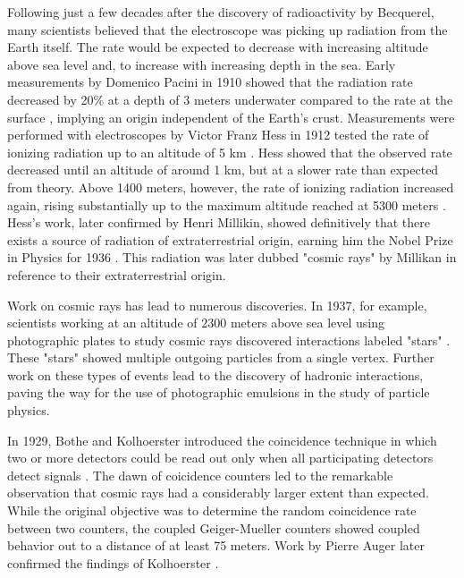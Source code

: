 Following just a few decades after the discovery of radioactivity by Becquerel, many scientists believed that the electroscope was picking up radiation from the Earth itself.
The rate would be expected to decrease with increasing altitude above sea level and, to increase with increasing depth in the sea.
Early measurements by Domenico Pacini in 1910 showed that the radiation rate decreased by 20\% at a depth of 3 meters underwater compared to the rate at the surface \cite{Pacini-CRSource}, implying an origin independent of the Earth's crust.
Measurements were performed with electroscopes by Victor Franz Hess in 1912 tested the rate of ionizing radiation up to an altitude of 5 km \cite{Hoerandel-CRHistory}.
Hess showed that the observed rate decreased until an altitude of around 1 km, but at a slower rate than expected from theory.
Above 1400 meters, however, the rate of ionizing radiation increased again, rising substantially up to the maximum altitude reached at 5300 meters \cite{Compton-CRAltitude}.
Hess's work, later confirmed by Henri Millikin, showed definitively that there exists a source of radiation of extraterrestrial origin, earning him the Nobel Prize in Physics for 1936 \cite{NobelPrize:1936-Hess}.
This radiation was later dubbed "cosmic rays" by Millikan in reference to their extraterrestrial origin.

Work on cosmic rays has lead to numerous discoveries.
In 1937, for example, scientists working at an altitude of 2300 meters above sea level using photographic plates to study cosmic rays discovered interactions labeled "stars" \cite{Blau-HadronicShowers}. 
These "stars" showed multiple outgoing particles from a single vertex.
Further work on these types of events lead to the discovery of hadronic interactions, paving the way for the use of photographic emulsions in the study of particle physics.

In 1929, Bothe and Kolhoerster introduced the coincidence technique in which two or more detectors could be read out only when all participating detectors detect signals \cite{Kolhoerster-CoincidenceDetectors}.
The dawn of coicidence counters led to the remarkable observation that cosmic rays had a considerably larger extent than expected.
While the original objective was to determine the random coincidence rate between two counters, the coupled Geiger-Mueller counters showed coupled behavior out to a distance of at least 75 meters.
Work by Pierre Auger later confirmed the findings of Kolhoerster .

